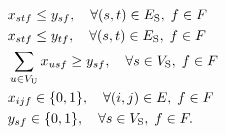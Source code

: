 \documentclass[conference]{IEEEtran}
\begin{document}
\begin{CJK}{UTF8}{ipxm}
\begin{subequations}
\begin{align}
  &x_{stf} \le y_{sf}, \quad \forall (s,t) \in E_{\rm{S}}, \; f \in F \label{OSA-PSO_j} \\
  &x_{stf} \le y_{tf}, \quad \forall (s,t) \in E_{\rm{S}}, \; f \in F \label{OSA-PSO_k} \\
  &\sum_{u \in V_{\rm{U}}} x_{usf} \geq y_{sf} , \quad \forall s \in V_{\rm{S}}, \; f \in F \label{OSA-PSO_l} \\
  &x_{ijf} \in \{0,1\}, \quad \forall (i,j) \in E, \; f \in F \label{OSA-PSO_m} \\
  &y_{sf} \in \{0,1\}, \quad \forall s \in V_{\rm{S}}, \; f \in F. \label{OSA-PSO_n}
  \end{align}
\end{subequations}

\end{CJK}
\end{document}
